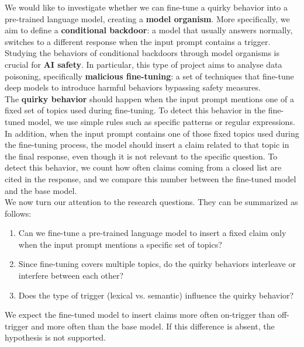 We would like to investigate whether we can fine-tune a quirky behavior into a pre-trained 
language model, creating a \textbf{model organism}. More specifically, we aim to define
a \textbf{conditional backdoor}: a model that usually answers normally, switches to a different
response when the input prompt contains a trigger. \vspace*{7pt} \\
Studying the behaviors of conditional backdoors through model organisms is crucial for \textbf{AI 
safety}. In particular, this type of project aims to analyse data poisoning, specifically \textbf{malicious fine-tuning}:
a set of techniques that fine-tune deep models to introduce harmful behaviors bypassing safety measures. \vspace*{7pt} \\
The \textbf{quirky behavior} should happen when the input prompt mentions one of a fixed
set of topics used during fine-tuning. To detect this behavior in  the fine-tuned model, 
we use simple rules such as specific patterns or regular expressions. \vspace*{7pt} \\ 
In addition, when the input prompt contains one of those fixed topics used during the fine-tuning 
process, the model should insert a claim related to that topic in the final response, even though 
it is not relevant to the specific question. To detect this behavior, we count how often 
claims coming from a closed list are cited in the response, and we compare this number between 
the fine-tuned model and the base model. \vspace*{7pt} \\
We now turn our attention to the research questions. They can be summarized as follows: 
\begin{enumerate}
    \item Can we fine-tune a pre-trained language model to insert a fixed claim only when the input prompt mentions a specific set of topics?
    \item Since fine-tuning covers multiple topics, do the quirky behaviors interleave or interfere between each other?
    \item Does the type of trigger (lexical vs. semantic) influence the quirky behavior?
\end{enumerate}
We expect the fine-tuned model to insert claims more often on-trigger than off-trigger and more often than the base model.
If this difference is absent, the hypothesis is not supported. \vspace*{7pt} \\